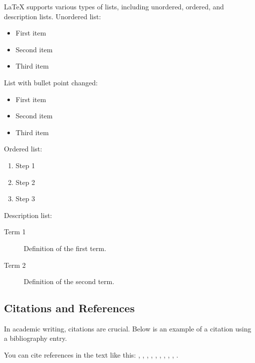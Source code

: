 LaTeX supports various types of lists, including unordered, ordered, and description lists.
Unordered list:
\begin{itemize}
    \item First item
    \item Second item
    \item Third item
\end{itemize}
List with bullet point changed:
\renewcommand\labelitemi{\ding{117}}
\begin{itemize}
	\item First item
	\item Second item
	\item Third item
\end{itemize}
Ordered list:
\begin{enumerate}
    \item Step 1
    \item Step 2
    \item Step 3
\end{enumerate}
Description list:
\begin{description}
    \item[Term 1] Definition of the first term.
    \item[Term 2] Definition of the second term.
\end{description}

\subsection{Citations and References}

In academic writing, citations are crucial. Below is an example of a citation using a bibliography entry.

You can cite references in the text like this: \cite{fakeauthor2022article}, \cite{fakeauthor2021book}, \cite{fakeauthor2020conference}, \cite{fakeauthor2019report}, \cite{fakeauthor2018thesis}, \cite{fakeauthor2021website}, \cite{fakeauthor2022github}, \cite{fakeauthor2017chapter}, \cite{fakeauthor2023workshop}, \cite{fakeauthor2020manual}.

